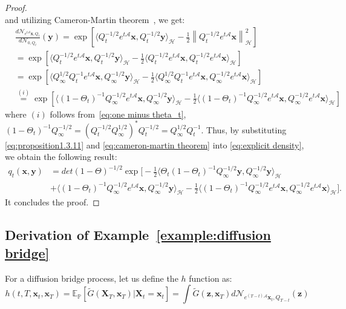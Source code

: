 \documentclass[nohyperref]{article}
\theoremstyle{plain}
\theoremstyle{remark}
\newcommand{\la}{\langle}
\newcommand{\ra}{\rangle}
\newcommand{\mc}{\mathcal}
\newcommand{\mb}{\mathbf}
\newcommand{\norm}[1]{\left\lVert#1\right\rVert}
\begin{document}
\begin{proof}
\begin{equation}
\end{equation}
and utilizing Cameron-Martin theorem~\citep[Theorem. 1.3.6]{da2002second}, we get:
\begin{align}
    & \frac{d\mc{N}_{e^{t\mc{A}}\mb{x}, Q_t}}{d\mc{N}_{0, Q_t}}(\mb{y}) = \exp \left[ \la  Q^{-1/2}_t e^{t\mc{A}}\mb{x}, Q^{-1/2}_t \mb{y} \ra_{\mc{H}} - \frac{1}{2}\norm{Q^{-1/2}_t e^{t\mc{A}}\mb{x}}^2_{\mc{H}}\right] \\
    & = \exp \left[ \la  Q^{-1/2}_t e^{t\mc{A}}\mb{x}, Q^{-1/2}_t \mb{y} \ra_{\mc{H}} - \frac{1}{2} \la Q^{-1/2}_t e^{t\mc{A}}\mb{x}, Q^{-1/2}_t e^{t\mc{A}}\mb{x} \ra_{\mc{H}}\right] \\
    & = \exp \left[ \la  Q_{\infty}^{1/2} Q^{-1}_t e^{t\mc{A}}\mb{x}, Q_{\infty}^{-1/2} \mb{y} \ra_{\mc{H}} - \frac{1}{2} \la Q^{1/2}_{\infty}Q^{-1}_t e^{t\mc{A}}\mb{x}, Q^{-1/2}_{\infty} e^{t\mc{A}}\mb{x} \ra_{\mc{H}}\right] \\
    & \stackrel{(i)}{=} \exp \left[ \la (1-\Theta_t)^{-1} Q^{-1/2}_{\infty} e^{t\mc{A}}\mb{x}, Q^{-1/2}_{\infty} \mb{y} \ra_{\mc{H}} - \frac{1}{2} \la (1-\Theta_t)^{-1} Q^{-1/2}_{\infty} e^{t\mc{A}}\mb{x},Q^{-1/2}_{\infty}  e^{t\mc{A}}\mb{x} \ra_{\mc{H}}\right] \label{eq:cameron-martin theorem}
\end{align}
where $(i)$ follows from~\eqref{eq:one minus theta_t}, $(1-\Theta_t)^{-1} Q^{-1/2}_{\infty} = (Q^{-1/2}_t Q^{1/2}_{\infty})^{*} Q^{-1/2}_t = Q_{\infty}^{1/2} Q^{-1}_t$. Thus, by substituting \eqref{eq:proposition1.3.11} and \eqref{eq:cameron-martin theorem} into \eqref{eq:explicit density}, we obtain the following result:
\begin{align}
     q_t(\mb{x}, \mb{y}) &= \textit{det}(1-\Theta)^{-1/2} \exp\bigg[-\frac{1}{2}\la \Theta_t (1-\Theta_t)^{-1} Q^{-1/2}_{\infty}\mb{y}, Q^{-1/2}_{\infty}\mb{y}\ra_{\mc{H}} \\
     & + \la (1-\Theta_t)^{-1} Q^{-1/2}_{\infty} e^{t\mc{A}}\mb{x}, Q^{-1/2}_{\infty} \mb{y} \ra_{\mc{H}} - \frac{1}{2} \la (1-\Theta_t)^{-1} Q^{-1/2}_{\infty} e^{t\mc{A}}\mb{x},Q^{-1/2}_{\infty}  e^{t\mc{A}}\mb{x} \ra_{\mc{H}} \bigg].
\end{align}
It concludes the proof.
\end{proof}


\subsection{Derivation of Example~\ref{example:diffusion bridge}}
For a diffusion bridge process, let us define the $h$ function as:
\begin{equation}
    h(t, T, \mb{x}_t, \mb{x}_T) =  \mathbb{E}_{\mathbb{P}}\left[\tilde{G}(\mb{X}_T, \mb{x}_T)|\mb{X}_t=\mb{x}_t\right] = \int \tilde{G}(\mb{z}, \mb{x}_T) d\mc{N}_{e^{(T-t)\mc{A}}\mb{x}_t, Q_{T-t}}(\mb{z})
\end{equation}
\end{document}
